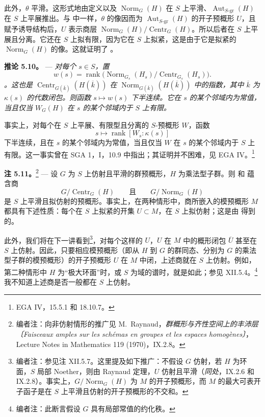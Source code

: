 此外，\(\theta\) 平滑。这形式地由定义以及 \(\operatorname{Norm}_G(H)\) 在 \(S\) 上平滑、\(\operatorname{Aut}_{S\text{-}\mathrm{gr}}(H)\) 在 \(S\) 上平展推出。与  中一样，\(\theta\) 的像因而为 \(\operatorname{Aut}_{S\text{-}\mathrm{gr}}(H)\) 的开子预概形 \(U\)，且赋予诱导结构后，\(U\) 表示商层 \(\operatorname{Norm}_G(H)/\operatorname{Centr}_G(H)\)。所以后者在 \(S\) 上平展且分离。它还在 \(S\) 上拟有限，因为它在 \(S\) 上拟紧，这是由于它是拟紧的 \(\operatorname{Norm}_G(H)\) 的像。这就证明了 。

\medskip\noindent{}\textbf{推论 5.10。} --- \textit{对每个 \(s\in S\)，置}  \[
  w(s)=
  \operatorname{rank}
  \bigl(
    \operatorname{Norm}_{G_s}(H_s)/
    \operatorname{Centr}_{G_s}(H_s)
  \bigr).
\]\textit{。这也是 \(\operatorname{Centr}_{G(\overline{k})}(H(\overline{k}))\) 在 \(\operatorname{Norm}_{G(\overline{k})}(H(\overline{k}))\) 中的指数，其中 \(\overline{k}\) 为 \(\kappa(s)\) 的代数闭包。则函数 \(s\mapsto w(s)\) 下半连续。它在 \(s\) 的某个邻域内为常值，当且仅当 \(W_G(H)\) 在 \(s\) 的某个邻域内于 \(S\) 上有限。}

事实上，对每个在 \(S\) 上平展、有限型且分离的 \(S\)-预概形 \(W\)，函数 \[
  s\longmapsto
  \operatorname{rank}[W_s:\kappa(s)]
\] 下半连续，且在 \(s\) 的某个邻域内为常值，当且仅当 \(W\) 在 \(s\) 的某个邻域内于 \(S\) 上有限。这一事实曾在 SGA 1，I，10.9 中指出；其证明并不困难，见 EGA IV。\footnote{EGA IV，15.5.1 和 18.10.7。}

\medskip\noindent{}\textbf{注 5.11。}\footnote{编者注：向非仿射情形的推广见 M.~Raynaud，\textit{群概形与齐性空间上的丰沛层〔Faisceaux amples sur les schémas en groupes et les espaces homogènes〕}，Lecture Notes in Mathematics 119 (1970)，IX.2.8。} --- 设 \(G\) 为 \(S\) 上仿射且平滑的群预概形，\(H\) 为乘法型子群。则  和  蕴含商  \[
  G/\operatorname{Centr}_G(H)
  \qquad\text{且}\qquad
  G/\operatorname{Norm}_G(H)
\] 是 \(S\) 上平滑且拟仿射的预概形。事实上，在两种情形中，商所嵌入的模预概形 \(M\) 都具有下述性质：每个在 \(S\) 上拟紧的开集 \(U\subset M\)，在 \(S\) 上拟仿射；这是由  得到的。

此外，我们将在下一讲看到\footnote{编者注：参见注 XII.5.7。这里提及如下推广：不假设 \(G\) 仿射，若 \(H\) 为环面，\(S\) 局部 Noether，则由 Raynaud 定理，\(U\) 仿射且平滑（\textit{同处}，IX.2.6 和 IX.2.8）。事实上，\(G/\operatorname{Norm}_G(H)\) 为 \(M\) 的开子预概形，而 \(M\) 的最大可表开子函子是在 \(S\) 上平滑且仿射的开子预概形的不交和。}，对每个这样的 \(U\)，\(U\) 在 \(M\) 中的概形闭包 \(\overline{U}\) 甚至在 \(S\) 上仿射。因此，只要相应模预概形（即从 \(H\) 到 \(G\) 的群同态、分别为 \(G\) 的乘法型子群的模预概形）的开子预概形 \(U\) 在 \(M\) 中闭，上述商就在 \(S\) 上仿射。例如，第二种情形中 \(H\) 为“极大环面”时，或 \(S\) 为域的谱时，就是如此；参见 XII.5.4。\footnote{编者注：此断言假设 \(G\) 具有局部常值的约化秩。}我不知道上述商是否一般都在 \(S\) 上仿射。


